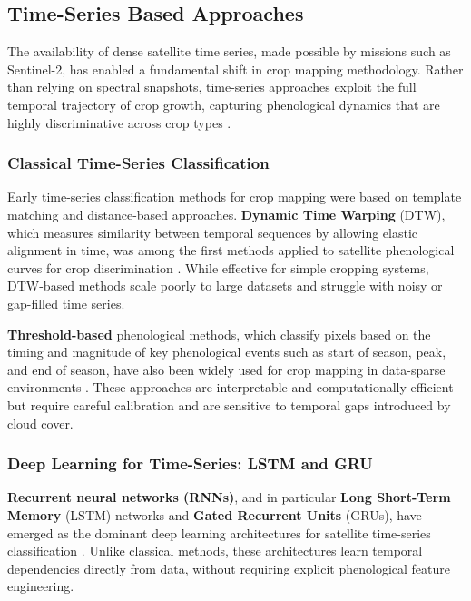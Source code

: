  \subsection{Time-Series Based Approaches}
  The availability of dense satellite time series, made 
  possible by missions such as Sentinel-2, has enabled 
  a fundamental shift in crop mapping methodology. Rather 
  than relying on spectral snapshots, time-series approaches 
  exploit the full temporal trajectory of crop growth, 
  capturing phenological dynamics that are highly 
  discriminative across crop types \cite{inglada2016}.


  \subsubsection{Classical Time-Series Classification}

    Early time-series classification methods for crop mapping 
    were based on template matching and distance-based 
    approaches. \textbf{Dynamic Time Warping} (DTW), which measures 
    similarity between temporal sequences by allowing 
    elastic alignment in time, was among the first methods 
    applied to satellite phenological curves for crop 
    discrimination \cite{maus2016}. While effective for 
    simple cropping systems, DTW-based methods scale poorly 
    to large datasets and struggle with noisy or 
    gap-filled time series.

    \textbf{Threshold-based} phenological methods, which classify 
    pixels based on the timing and magnitude of key 
    phenological events such as start of season, peak, 
    and end of season, have also been widely used 
    for crop mapping in data-sparse environments 
    \cite{barcanibar2020}. These approaches are 
    interpretable and computationally efficient but 
    require careful calibration and are sensitive 
    to temporal gaps introduced by cloud cover.

    \subsubsection{Deep Learning for Time-Series: LSTM and GRU}

    \textbf{Recurrent neural networks (RNNs)}, and in particular 
    \textbf{Long Short-Term Memory} (LSTM) networks and \textbf{Gated 
    Recurrent Units} (GRUs), have emerged as the dominant 
    deep learning architectures for satellite time-series 
    classification \cite{hochreiter1997}. Unlike classical 
    methods, these architectures learn temporal dependencies 
    directly from data, without requiring explicit 
    phenological feature engineering.

